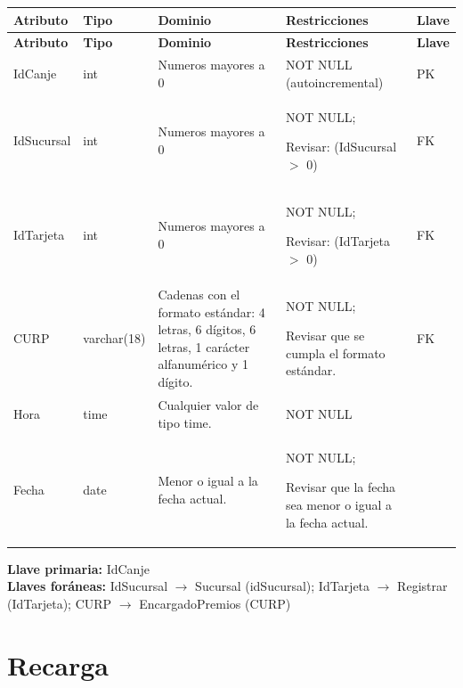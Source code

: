 \documentclass[12pt]{article}
\begin{document}
\begin{longtable}{p{2.2cm} p{2.2cm} p{5.8cm} p{4.0cm} p{1.2cm}}
\label{tab:canje}\\
\toprule
\textbf{Atributo} & \textbf{Tipo} & \textbf{Dominio} & \textbf{Restricciones} & \textbf{Llave} \\
\midrule
\endfirsthead

\toprule
\textbf{Atributo} & \textbf{Tipo} & \textbf{Dominio} & \textbf{Restricciones} & \textbf{Llave} \\
\midrule
\endhead

\bottomrule
\endfoot


IdCanje 
& int 
& Numeros mayores a 0
& NOT NULL (autoincremental)
& PK \\

IdSucursal 
& int 
& Numeros mayores a 0
& NOT NULL;

Revisar: (IdSucursal $>$ 0)
& FK \\

IdTarjeta 
& int 
& Numeros mayores a 0
& NOT NULL;

Revisar: (IdTarjeta $>$ 0)
& FK \\

CURP 
& varchar(18) 
& Cadenas con el formato estándar: 4 letras, 6 dígitos, 6 letras, 1 carácter alfanumérico y 1 dígito.
& NOT NULL;

Revisar que se cumpla el formato estándar.
& FK \\

Hora 
& time 
& Cualquier valor de tipo time.
& NOT NULL
&  \\

Fecha 
& date 
& Menor o igual a la fecha actual.
& NOT NULL;

Revisar que la fecha sea menor o igual a la fecha actual.
&  \\

\end{longtable}

\textbf{Llave primaria:} IdCanje\\
\textbf{Llaves foráneas:} IdSucursal $\rightarrow$ Sucursal (idSucursal); IdTarjeta $\rightarrow$ Registrar (IdTarjeta); CURP $\rightarrow$ EncargadoPremios (CURP)

 

\section*{Recarga}
\end{document}
